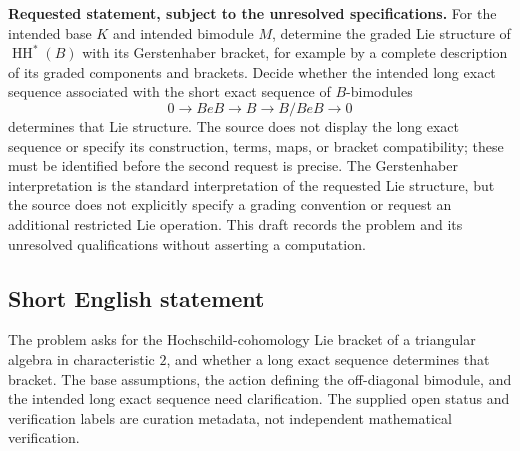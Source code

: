 \documentclass[11pt]{article}
\begin{document}
\textbf{Requested statement, subject to the unresolved specifications.} For the intended base \(K\) and intended bimodule \(M\), determine the graded Lie structure of \(\operatorname{HH}^*(B)\) with its Gerstenhaber bracket, for example by a complete description of its graded components and brackets. Decide whether the intended long exact sequence associated with the short exact sequence of \(B\)-bimodules
\[
0\longrightarrow BeB\longrightarrow B\longrightarrow B/BeB\longrightarrow0
\]
determines that Lie structure. The source does not display the long exact sequence or specify its construction, terms, maps, or bracket compatibility; these must be identified before the second request is precise. The Gerstenhaber interpretation is the standard interpretation of the requested Lie structure, but the source does not explicitly specify a grading convention or request an additional restricted Lie operation. This draft records the problem and its unresolved qualifications without asserting a computation.
\subsection{Short English statement}
The problem asks for the Hochschild-cohomology Lie bracket of a triangular algebra in characteristic \(2\), and whether a long exact sequence determines that bracket. The base assumptions, the action defining the off-diagonal bimodule, and the intended long exact sequence need clarification. The supplied open status and verification labels are curation metadata, not independent mathematical verification.
\end{document}
